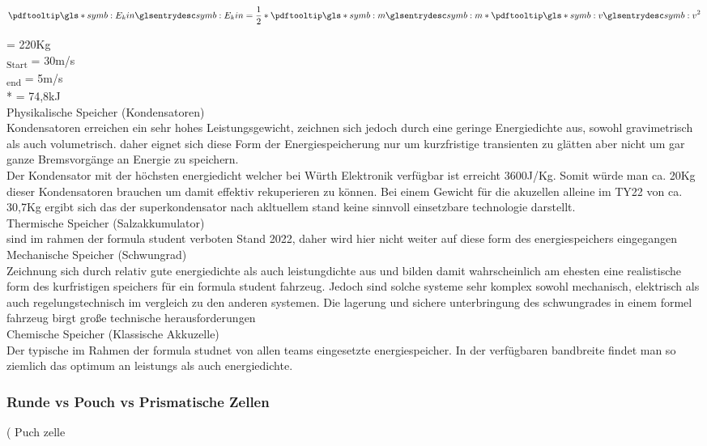 \begin{equation}
\glsc{symb:E_kin} = \dfrac{1}{2} * \glsc{symb:m} * \glsc{symb:v}^2
\end{equation}

 = 220Kg
\\
\textsubscript{Start} = 30m/s
\\
\textsubscript{end} = 5m/s
\\
 *  = 74,8kJ
\\

Physikalische Speicher (Kondensatoren)
\\
	Kondensatoren erreichen ein sehr hohes Leistungsgewicht, zeichnen sich jedoch durch eine geringe Energiedichte aus, sowohl gravimetrisch als auch volumetrisch. daher eignet sich diese Form der Energiespeicherung nur um kurzfristige transienten zu glätten aber nicht um gar ganze Bremsvorgänge an Energie zu speichern.\\
	Der Kondensator mit der höchsten energiedicht welcher bei Würth Elektronik verfügbar ist erreicht 3600J/Kg. Somit würde man ca. 20Kg dieser Kondensatoren brauchen um damit effektiv rekuperieren zu können. Bei einem Gewicht für die akuzellen alleine im TY22 von ca. 30,7Kg ergibt sich das der superkondensator nach akltuellem stand keine sinnvoll einsetzbare technologie darstellt.
\\
Thermische Speicher (Salzakkumulator)
\\
	sind im rahmen der formula student verboten Stand 2022, daher wird hier nicht weiter auf diese form des energiespeichers eingegangen
\\
Mechanische Speicher (Schwungrad)
\\
	Zeichnung sich durch relativ gute energiedichte als auch leistungdichte aus und bilden damit wahrscheinlich am ehesten eine realistische form des kurfristigen speichers für ein formula student fahrzeug. Jedoch sind solche systeme sehr komplex sowohl mechanisch, elektrisch als auch regelungstechnisch im vergleich zu den anderen systemen. Die lagerung und sichere unterbringung des schwungrades in einem formel fahrzeug birgt große technische herausforderungen
\\
Chemische Speicher (Klassische Akkuzelle)
\\
	Der typische im Rahmen der formula studnet von allen teams eingesetzte energiespeicher. In der verfügbaren bandbreite findet man so ziemlich das optimum an leistungs als auch energiedichte.
\FloatBarrier
\subsubsection{Runde vs Pouch vs Prismatische Zellen}
(
	Puch zelle

